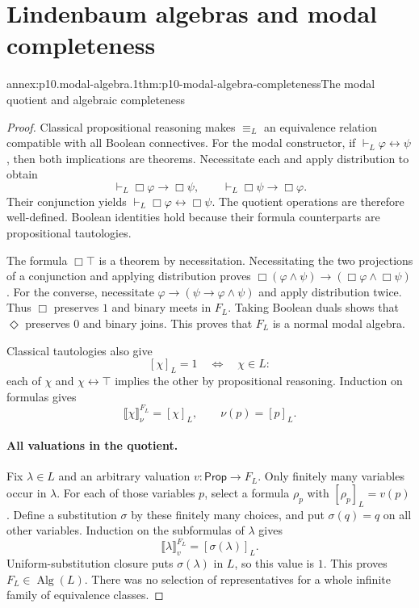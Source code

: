 
\section{Lindenbaum algebras and modal completeness}

\begin{annexitem}{annex:p10.modal-algebra.1}{thm:p10-modal-algebra-completeness}{The modal quotient and algebraic completeness}
\begin{proof}
Classical propositional reasoning makes \(\equiv_L\) an
equivalence relation compatible with all Boolean connectives.
For the modal constructor, if
\(\vdash_L\varphi\leftrightarrow\psi\), then both implications
are theorems.  Necessitate each and apply distribution to obtain
\[
 \vdash_L\Box\varphi\to\Box\psi,\qquad
 \vdash_L\Box\psi\to\Box\varphi.
\]
Their conjunction yields
\(\vdash_L\Box\varphi\leftrightarrow\Box\psi\).
The quotient operations are therefore well-defined.
Boolean identities hold because their formula counterparts are
propositional tautologies.

The formula \(\Box\top\) is a theorem by necessitation.
Necessitating the two projections of a conjunction and applying
distribution proves
\(\Box(\varphi\wedge\psi)\to
(\Box\varphi\wedge\Box\psi)\).
For the converse, necessitate
\(\varphi\to(\psi\to\varphi\wedge\psi)\) and apply
distribution twice.
Thus \(\Box\) preserves \(1\) and binary meets in \(F_L\).
Taking Boolean duals shows that \(\Diamond\) preserves
\(0\) and binary joins.
This proves that \(F_L\) is a normal modal algebra.

Classical tautologies also give
\[
 [\chi]_L=1\quad\Longleftrightarrow\quad\chi\in L:
\]
each of \(\chi\) and \(\chi\leftrightarrow\top\) implies
the other by propositional reasoning.
Induction on formulas gives
\[
 \llbracket\chi\rrbracket_\nu^{F_L}=[\chi]_L,
 \qquad \nu(p)=[p]_L.
\]

\paragraph{All valuations in the quotient.}
Fix \(\lambda\in L\) and an arbitrary valuation
\(v:\mathsf{Prop}\to F_L\).
Only finitely many variables occur in \(\lambda\).
For each of those variables \(p\), select a formula \(\rho_p\)
with \([\rho_p]_L=v(p)\).
Define a substitution \(\sigma\) by these finitely many choices,
and put \(\sigma(q)=q\) on all other variables.
Induction on the subformulas of \(\lambda\) gives
\[
 \llbracket\lambda\rrbracket_v^{F_L}=[\sigma(\lambda)]_L.
\]
Uniform-substitution closure puts \(\sigma(\lambda)\) in \(L\),
so this value is \(1\).
This proves \(F_L\in\operatorname{Alg}(L)\).
There was no selection of representatives for a whole infinite
family of equivalence classes.


\end{proof}
\end{annexitem}
